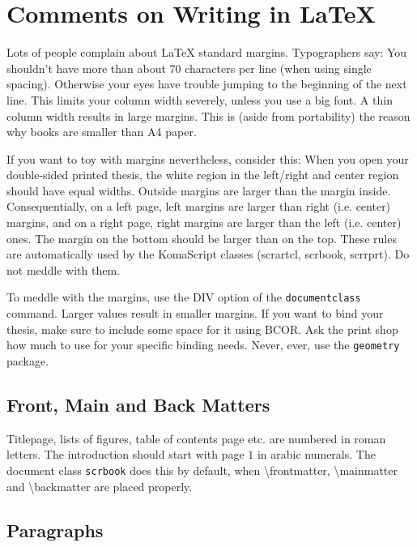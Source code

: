 \documentclass[12pt, %
a4paper, %
twoside, %
openright, %
abstract=on, %
DIV=11,      %
BCOR=8mm]{scrbook} %
\begin{document}
    \chapter{Comments on Writing in LaTeX}

    Lots of people complain about \LaTeX{} standard margins.  Typographers 
    say: You shouldn't have  more than about 70 characters  per line (when 
    using single  spacing).  Otherwise your  eyes have trouble  jumping to 
    the  beginning  of the  next  line.   This  limits your  column  width 
    severely, unless you  use a big font.  A thin  column width results in 
    large margins.  This is (aside  from portability) the reason why books 
    are smaller than A4 paper.

    If you want to toy  with margins nevertheless, consider this: When you 
    open  your  double-sided  printed  thesis, the  white  region  in  the 
    left/right  and  center  region  should have  equal  widths.   Outside 
    margins are larger than the margin inside.  Consequentially, on a left 
    page, left  margins are larger  than right (i.e. center)  margins, and 
    on  a  right page,  right  margins  are  larger  than the  left  (i.e. 
    center) ones. The  margin on the bottom  should be larger than  on the 
    top.  These  rules are  automatically used  by the  KomaScript classes 
    (scrartcl, scrbook, scrrprt).  Do not meddle with them.
    
    To   meddle  with   the   margins,   use  the   DIV   option  of   the 
    \verb+documentclass+  command.    Larger  values  result   in  smaller 
    margins.  If you  want to bind your thesis, make  sure to include some 
    space for it using BCOR.  Ask the  print shop how much to use for your 
    specific binding needs.  Never, ever, use the \verb+geometry+ package. 

    \section{Front, Main and Back Matters}

    Titlepage, lists of figures, table  of contents page etc. are numbered 
    in  roman letters.   The introduction  should start  with page  $1$ in 
    arabic  numerals.   The document  class  \verb+scrbook+  does this  by 
    default,  when \textbackslash  frontmatter, \textbackslash  mainmatter 
    and \textbackslash backmatter are placed properly.                     


    \section{Paragraphs}
    \label{sec:paras}
\end{document}
